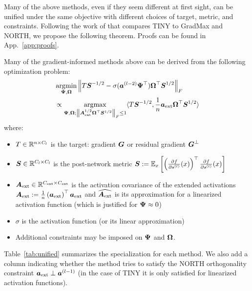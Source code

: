 Many of the above methods, even if they seem different at first sight, can be unified under the same objective with different choices of target, metric, and constraints. Following the work of \citep{verbockhavenSpottingExpressivityBottlenecks2025} that compares TINY to GradMax and NORTH, we propose the following theorem. Proofs can be found in App.~\ref{app:proofs}.
\begin{theorem}\label{thm:unified_obj_main_text}
Many of the gradient-informed methods above can be derived from the following optimization problem:
\begin{align}\label{eqn:unified_obj}
& \argmin_{\Fanin, \Fanout} \frob{T \isqrtS - \sigma(\Postact[l-2] \trans{\Fanin}) \trans{\Fanout} \sqrtS}\\
&\propto \argmax_{\Fanin, \Fanout; \frob{\sqrtAext \trans{\Fanout} \sqrtS} \le 1} \scalarp{T \isqrtS, \frac{1}{n} \Postactext \trans{\Fanout} \sqrtS}
\end{align}
where:
\begin{itemize}
    \item $T \in \mathbb{R}^{n \times \cp}$ is the target: gradient $\Gradpreact$ or residual gradient $\Bottleneck$
    \item $\covgrad \in \mathbb{R}^{\cp \times \cp}$ is the post-network metric $\covgrad := \EE_x\left[\transp{\frac{\partial f}{\partial \preact[l]}(x)} \frac{\partial f}{\partial \preact[l]}(x) \right]$
    \item $\Aext \in \mathbb{R}^{\cext \times \cext}$ is the activation covariance of the extended activations $\Aext:= \frac{1}{n} \transp{\Postactext} \Postactext$ and $\widehat{\Aext}$ is its approximation for a linearized activation function (which is justified for $\Fanin \approx 0$)
    \item $\sigma$ is the activation function (or its linear approximation)
    \item Additional constraints may be imposed on $\Fanin$ and $\Fanout$.
\end{itemize}

\noindent Table~\ref{tab:unified} summarizes the specialization for each method. We also add a column indicating whether the method tries to satisfy the NORTH orthogonality constraint $\Postactext \perp \Postact[l-1]$ (in the case of TINY it is only satisfied for linearized activation functions).
\end{theorem}

